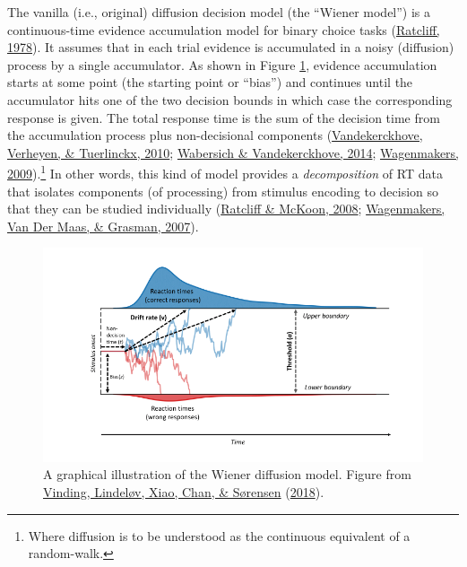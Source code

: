 \documentclass[
  11pt,
  english,
  ,doc,floatsintext]{apa6}
\begin{document}
The vanilla (i.e., original) diffusion decision model (the ``Wiener model'') is a continuous-time evidence accumulation model for binary choice tasks (\protect\hyperlink{ref-ratcliff_theory_1978}{Ratcliff, 1978}). It assumes that in each trial evidence is accumulated in a noisy (diffusion) process by a single accumulator. As shown in Figure \ref{fig:wiener-figure}, evidence accumulation starts at some point (the starting point or ``bias'') and continues until the accumulator hits one of the two decision bounds in which case the corresponding response is given. The total response time is the sum of the decision time from the accumulation process plus non-decisional components (\protect\hyperlink{ref-vandekerckhove_crossed_2010}{Vandekerckhove, Verheyen, \& Tuerlinckx, 2010}; \protect\hyperlink{ref-wabersich_rwiener_2014}{Wabersich \& Vandekerckhove, 2014}; \protect\hyperlink{ref-wagenmakers_methodological_2009-1}{Wagenmakers, 2009}).\footnote{Where diffusion is to be understood as the continuous equivalent of a random-walk.} In other words, this kind of model provides a \emph{decomposition} of RT data that isolates components (of processing) from stimulus encoding to decision so that they can be studied individually (\protect\hyperlink{ref-ratcliff_diffusion_2008}{Ratcliff \& McKoon, 2008}; \protect\hyperlink{ref-wagenmakers_ez-diffusion_2007}{Wagenmakers, Van Der Maas, \& Grasman, 2007}).



\begin{figure}[!htb]

{\centering \includegraphics[width=0.75\linewidth]{figures/wiener_figure} 

}

\caption{A graphical illustration of the Wiener diffusion model. Figure from \protect\hyperlink{ref-vinding_volition_2018}{Vinding, Lindeløv, Xiao, Chan, \& Sørensen} (\protect\hyperlink{ref-vinding_volition_2018}{2018}).}\label{fig:wiener-figure}
\end{figure}
\end{document}
